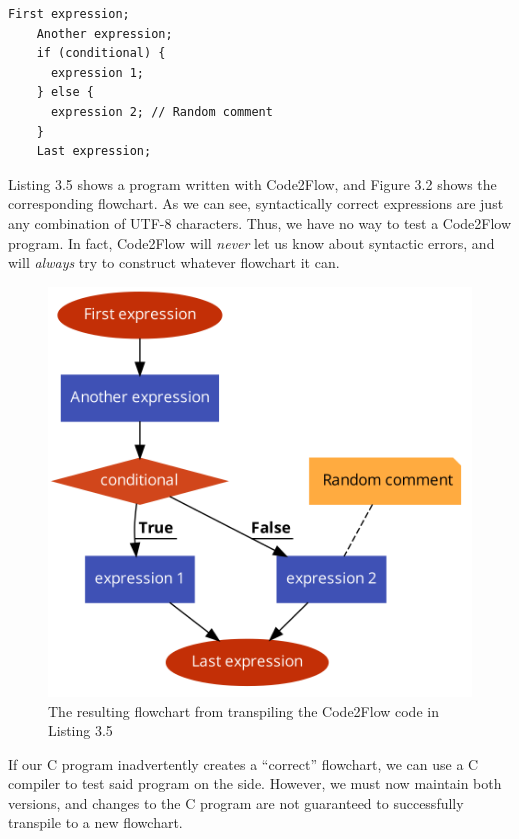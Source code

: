 \begin{lstlisting}[caption={A Code2Flow program}, captionpos=b, frame=trbl]
    First expression;
    Another expression;
    if (conditional) {
      expression 1;
    } else {
      expression 2; // Random comment
    }
    Last expression;
\end{lstlisting}

Listing 3.5 shows a program written with Code2Flow, and Figure 3.2 shows the corresponding flowchart. As we can see, syntactically correct expressions are just any combination of UTF-8 characters. Thus, we have no way to test a Code2Flow program. In fact, Code2Flow will \textit{never} let us know about syntactic errors, and will \textit{always} try to construct whatever flowchart it can. \\

\begin{figure}[ht]
    \centering
    \includegraphics[scale=0.2]{assets/code2flow_example.png}
    \caption{The resulting flowchart from transpiling the Code2Flow code in Listing 3.5}
    \label{fig:code2flow}
\end{figure}

If our C program inadvertently creates a ``correct'' flowchart, we can use a C compiler to test said program on the side. However, we must now maintain both versions, and changes to the C program are not guaranteed to successfully transpile to a new flowchart.

